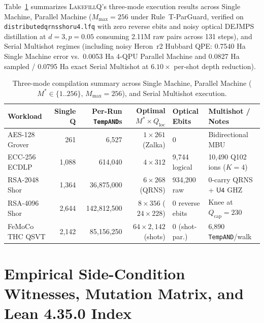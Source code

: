 \documentclass[acmsmall,screen,anonymous]{acmart}
\DeclareRobustCommand{\_}{\ifmmode\text{\char95}\else\char95\penalty0\relax\fi}
\theoremstyle{plain}
\newcommand{\LakefillQ}{\textsc{LakefillQ}}
\begin{document}
Table~\ref{tab:t18} summarizes \LakefillQ{}'s three-mode execution results across Single Machine, Parallel Machine ($M_{\max} = 256$ under Rule~\textsf{T-ParGuard}, verified on \texttt{distributed\_qrns\_shor\_u4.lfq} with zero reverse ebits and noisy optical DEJMPS distillation at $d=3, p=0.05$ consuming 2.11M raw pairs across 131 steps), and Serial Multishot regimes (including noisy Heron~r2 Hubbard QPE: 0.7540 Ha Single Machine error vs.\ 0.0053 Ha 4-QPU Parallel Machine and 0.0827 Ha sampled / 0.0795 Ha exact Serial Multishot at $6.10\times$ per-shot depth reduction).

\begin{table}[ht]
\centering
\caption{Three-mode compilation summary across Single Machine, Parallel Machine ($M^* \in \{1..256\}$, $M_{\max} = 256$), and Serial Multishot execution.}
\label{tab:t18}
\footnotesize
\setlength{\tabcolsep}{4pt}
\begin{tabular}{lrrrll}
\toprule
Workload & Single Q & Per-Run \texttt{TempAND}s & Optimal $M^* \times Q_{\mathrm{loc}}$ & Optical Ebits & Multishot / Notes \\
\midrule
AES-128 Grover & 261 & 6,527 & $1 \times 261$ (Zalka) & $0$ & Bidirectional MBU \\
ECC-256 ECDLP & 1,088 & 614,040 & $4 \times 312$ & 9,744 logical & 10,490 Q102 ions ($K=4$) \\
RSA-2048 Shor & 1,364 & 36,875,000 & $6 \times 268$ (QRNS) & 934,200 raw & $0$-carry QRNS + $\mathsf{U4}$ GHZ \\
RSA-4096 Shor & 2,644 & 142,812,500 & $8 \times 356$ ($24 \times 228$) & $0$ reverse ebits & Knee at $Q_{\mathrm{cap}} = 230$ \\
FeMoCo THC QSVT & 2,142 & 85,156,250 & $64 \times 2,142$ (shots) & $0$ (shot-par.) & 6,890 \texttt{TempAND}/walk \\
\bottomrule
\end{tabular}
\end{table}

\section{Empirical Side-Condition Witnesses, Mutation Matrix, and Lean 4.35.0 Index}
\label{app:audit}
\end{document}
